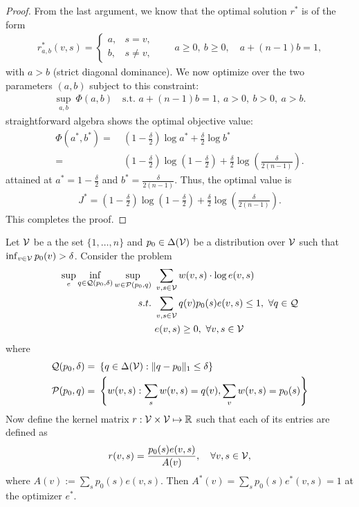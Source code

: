\begin{proof}
From the last argument, we know that the optimal solution $r^*$ is of the form
\begin{align*}
r^*_{a,b}(v,s)
=
\begin{cases}
a, & s=v,\\
b, & s\neq v,
\end{cases}
\qquad a\ge 0,\ b\ge 0,\quad a+(n-1)b=1,
\end{align*}
with $a>b$ (strict diagonal dominance). We now optimize over the two parameters $(a,b)$ subject to this constraint:
\begin{align*}
\sup_{a,b}~\Phi(a,b)
\quad\text{s.t. } a+(n-1)b=1,\ a>0,\ b>0,\ a>b.
\end{align*}
straightforward algebra shows the optimal objective value:
\begin{align*}
\Phi(a^*,b^*)
= &~ (1-\tfrac{\delta}{2})\log a^* + \tfrac{\delta}{2}\log b^*\\
= &~ (1-\tfrac{\delta}{2})\log\left(1-\frac{\delta}{2}\right)
 + \tfrac{\delta}{2}\log\left(\frac{\delta}{2(n-1)}\right).
\end{align*}
attained at 
$a^* = 1 - \frac{\delta}{2}$ and $b^* = \frac{\delta}{2(n-1)}.
$
Thus, the optimal value is
\begin{align*}
J^*
= (1-\tfrac{\delta}{2})\log\left(1-\frac{\delta}{2}\right)
 + \tfrac{\delta}{2}\log\left(\frac{\delta}{2(n-1)}\right).
\end{align*}
This completes the proof.

\end{proof}

\begin{lemma}\label{lem:normalizationconstant}
Let $\mathcal{V}$ be a the set $\{1,\dots,n\}$ and $p_0 \in \Delta(\mathcal{V})$ be a distribution over $\mathcal{V}$ such that $\inf_{v \in \mathcal{V}}p_0(v) > \delta$. Consider the problem
\begin{align*}
    \sup_{e} \inf_{q \in \mathcal{Q}(p_0,\delta)} \sup_{w \in \mathcal{P}(p_0,q)} &~  \sum_{v,s \in \mathcal{V}} w(v,s) \cdot \log e(v,s) \\
    s.t. &~ \sum_{v,s \in \mathcal{V}} q(v) p_0(s) e(v,s) \leq 1, ~ \forall q \in \mathcal{Q}\notag\\
    &~ e(v,s) \geq 0,~ \forall v,s \in \mathcal{V} \notag 
\end{align*}
where 
\begin{align*}
    \mathcal{Q}(p_0,\delta) = &~ \left\{q \in \Delta(\mathcal{V}): \|q - p_0\|_1 \leq \delta\right\} \\
    \mathcal{P}(p_0,q) = &~ \left\{w(v,s): \sum_{s}w(v,s) = q(v), \sum_vw(v,s) =  p_0(s)\right\}
\end{align*}
Now define the kernel matrix $r:\mathcal{V} \times \mathcal{V} \mapsto \mathbb{R}$ such that each of its entries are defined as 
$$r(v,s) = \frac{p_0(s)e(v,s)}{A(v)}, \quad \forall v,s \in \mathcal{V},$$
where $A(v) := \sum_s p_0(s)e(v,s)$. Then $A^*(v) = \sum_sp_0(s)e^*(v,s) = 1$ at the optimizer $e^*$.
\end{lemma}

